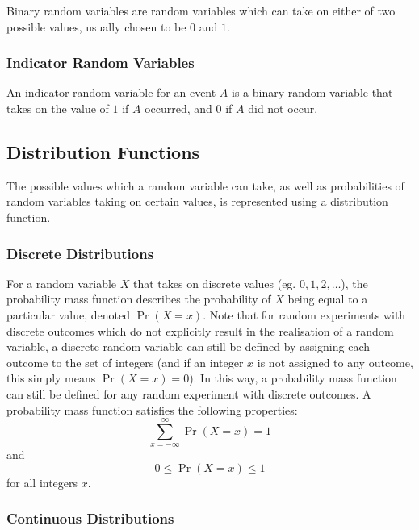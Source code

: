 \documentclass[11pt]{report} %
\begin{document}
Binary random variables are random variables which can take on either of two possible values, usually chosen to be $0$ and $1$.

\subsubsection{Indicator Random Variables}

An indicator random variable for an event $A$ is a binary random variable that takes on the value of $1$ if $A$ occurred, and $0$ if $A$ did not occur.

\subsection{Distribution Functions}

The possible values which a random variable can take, as well as probabilities of random variables taking on certain values, is represented using a distribution function.

\subsubsection{Discrete Distributions}

For a random variable $X$ that takes on discrete values (eg. $0, 1, 2, \dots$), the probability mass function describes the probability of $X$ being equal to a particular value, denoted $\operatorname{Pr}\left(X = x\right)$. Note that for random experiments with discrete outcomes which do not explicitly result in the realisation of a random variable, a discrete random variable can still be defined by assigning each outcome to the set of integers (and if an integer $x$ is not assigned to any outcome, this simply means $\operatorname{Pr}\left(X = x\right) = 0$). In this way, a probability mass function can still be defined for any random experiment with discrete outcomes. A probability mass function satisfies the following properties:
\begin{equation}
\sum_{x=-\infty}^{\infty}\operatorname{Pr}\left(X = x\right) = 1
\end{equation}
and
\begin{equation}
0 \leq \operatorname{Pr}\left(X = x\right) \leq 1
\end{equation}
for all integers $x$.

\subsubsection{Continuous Distributions}
\end{document}
